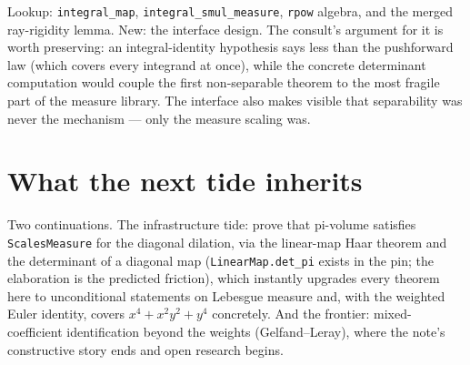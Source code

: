 \documentclass[11pt]{article}
\newcommand{\code}[1]{\texttt{#1}}
\begin{document}
Lookup: \code{integral\_map}, \code{integral\_smul\_measure},
\code{rpow} algebra, and the merged ray-rigidity lemma. New: the
interface design. The consult's argument for it is worth preserving:
an integral-identity hypothesis says less than the pushforward law
(which covers every integrand at once), while the concrete
determinant computation would couple the first non-separable theorem
to the most fragile part of the measure library. The interface also
makes visible that separability was never the mechanism --- only the
measure scaling was.

\section{What the next tide inherits}

Two continuations. The infrastructure tide: prove that pi-volume
satisfies \code{ScalesMeasure} for the diagonal dilation, via the
linear-map Haar theorem and the determinant of a diagonal map
(\code{LinearMap.det\_pi} exists in the pin; the elaboration is the
predicted friction), which instantly upgrades every theorem here to
unconditional statements on Lebesgue measure and, with the weighted
Euler identity, covers $x^4 + x^2y^2 + y^4$ concretely. And the
frontier: mixed-coefficient identification beyond the weights
(Gelfand--Leray), where the note's constructive story ends and open
research begins.
\end{document}
